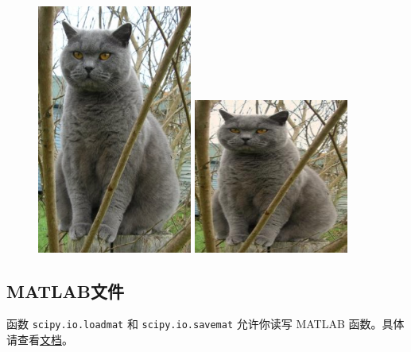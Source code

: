 \begin{frame}
\begin{figure}[htbp]
\centering
\includegraphics[width=2in]{images/cat.jpg}
\includegraphics[width=2in]{images/cat_tinted.jpg}
\end{figure}
\end{frame}
\subsection{MATLAB文件}

\begin{frame}

函数 \lstinline|scipy.io.loadmat| 和 \lstinline|scipy.io.savemat| 允许你读写 MATLAB 函数。具体请查看\href{http://docs.scipy.org/doc/scipy/reference/io.html}{文档}。
\end{frame}

